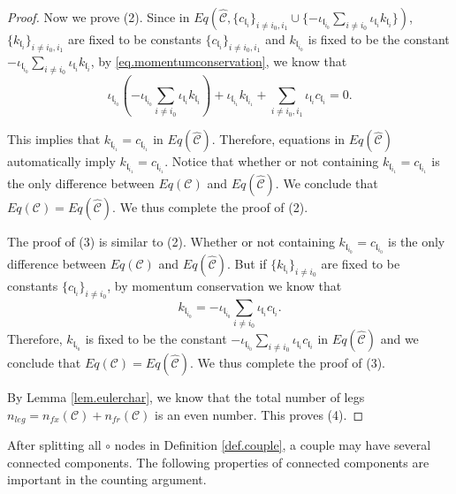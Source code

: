 \begin{proof}
Now we prove (2). Since in $Eq\left(\widehat{\mathcal{C}}, \{c_{\mathfrak{l}_{i}}\}_{i\ne i_0, i_1}\cup \{-\iota_{\mathfrak{l}_{i_0}}\sum_{i\ne i_0} \iota_{\mathfrak{l}_i}k_{\mathfrak{l}_i}\}\right)$, $\{k_{\mathfrak{l}_{i}}\}_{i\ne i_0, i_1}$ are fixed to be constants $\{c_{\mathfrak{l}_{i}}\}_{i\ne i_0, i_1}$ and $k_{\mathfrak{l}_{i_0}}$ is fixed to be the constant $-\iota_{\mathfrak{l}_{i_0}}\sum_{i\ne i_0} \iota_{\mathfrak{l}_i}k_{\mathfrak{l}_i}$, by \eqref{eq.momentumconservation}, we know that 
\begin{equation}
 \iota_{\mathfrak{l}_{i_0}}\left(-\iota_{\mathfrak{l}_{i_0}}\sum_{i\ne i_0} \iota_{\mathfrak{l}_i}k_{\mathfrak{l}_i}\right)+ \iota_{\mathfrak{l}_{i_1}}k_{\mathfrak{l}_{i_1}}+\sum_{i\ne i_0, i_1} \iota_{\mathfrak{l}_i}c_{\mathfrak{l}_i}=0.
\end{equation}

This implies that $k_{\mathfrak{l}_{i_1}}=c_{\mathfrak{l}_{i_1}}$ in $Eq(\widehat{\mathcal{C}})$. Therefore, equations in $Eq(\widehat{\mathcal{C}})$ automatically imply $k_{\mathfrak{l}_{i_1}}=c_{\mathfrak{l}_{i_1}}$. Notice that whether or not containing $k_{\mathfrak{l}_{i_1}}=c_{\mathfrak{l}_{i_1}}$ is the only difference between $Eq(\mathcal{C})$ and $Eq(\widehat{\mathcal{C}})$. We conclude that $Eq(\mathcal{C})=Eq(\widehat{\mathcal{C}})$. We thus complete the proof of (2).

The proof of (3) is similar to (2). Whether or not containing $k_{\mathfrak{l}_{i_0}}=c_{\mathfrak{l}_{i_0}}$ is the only difference between $Eq(\mathcal{C})$ and $Eq(\widehat{\mathcal{C}})$. But if $\{k_{\mathfrak{l}_{i}}\}_{i\ne i_0}$ are fixed to be constants $\{c_{\mathfrak{l}_{i}}\}_{i\ne i_0}$, by momentum conservation we know that 
\begin{equation}
 k_{\mathfrak{l}_{i_0}}=-\iota_{\mathfrak{l}_{i_0}}\sum_{i\ne i_0} \iota_{\mathfrak{l}_i}c_{\mathfrak{l}_i}.
\end{equation}
Therefore, $k_{\mathfrak{l}_{i_0}}$ is fixed to be the constant $-\iota_{\mathfrak{l}_{i_0}}\sum_{i\ne i_0} \iota_{\mathfrak{l}_i}c_{\mathfrak{l}_i}$ in $Eq(\widehat{\mathcal{C}})$ and we conclude that $Eq(\mathcal{C})=Eq(\widehat{\mathcal{C}})$. We thus complete the proof of (3).

By Lemma \ref{lem.eulerchar}, we know that the total number of legs $n_{leg} = n_{fx}(\mathcal{C})+n_{\textit{fr}}(\mathcal{C})$ is an even number. This proves (4).
\end{proof}

After splitting all $\circ$ nodes in Definition \ref{def.couple}, a couple may have several connected components. The following properties of connected components are important in the counting argument.

